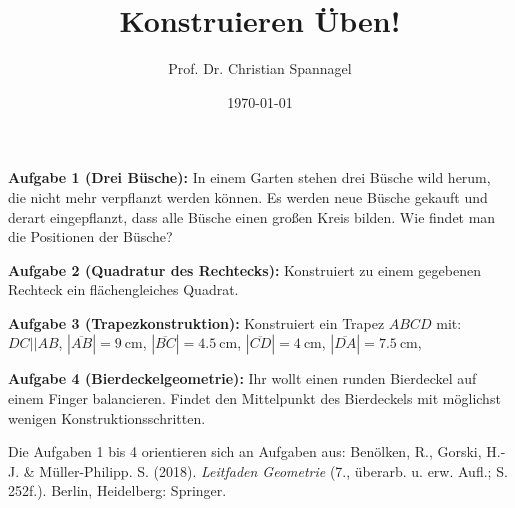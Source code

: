 \documentclass{../cssheet}
\title{Konstruieren Üben!}
\author{Prof. Dr. Christian Spannagel}
\date{\today}
\begin{document}
\printtitle

\textbf{Aufgabe 1 (Drei Büsche):}  In einem Garten stehen drei Büsche wild herum, die nicht mehr verpflanzt werden können. Es werden neue Büsche gekauft und derart eingepflanzt, dass alle Büsche einen großen Kreis bilden. Wie findet man die Positionen der Büsche?

\textbf{Aufgabe 2 (Quadratur des Rechtecks):}  Konstruiert zu einem gegebenen Rechteck ein flächengleiches Quadrat.

\textbf{Aufgabe 3 (Trapezkonstruktion):}  Konstruiert ein Trapez $ABCD$ mit:\\ $DC || AB$, $ |\overline{AB}| =\SI{9}{\cm}$, $|\overline{BC}|=\SI{4,5}{\cm}$, $|\overline{CD}|=\SI{4}{\cm}$, $|\overline{DA}|=\SI{7,5}{\cm}$, 

\textbf{Aufgabe 4 (Bierdeckelgeometrie):}  Ihr wollt einen runden Bierdeckel auf einem Finger balancieren. Findet den Mittelpunkt des Bierdeckels mit möglichst wenigen Konstruktionsschritten. 

\vspace*{5cm}
Die Aufgaben 1 bis 4 orientieren sich an Aufgaben aus: Benölken, R., Gorski, H.-J. \& Müller-Philipp. S. (2018). \emph{Leitfaden Geometrie} (7., überarb. u. erw. Aufl.; S. 252f.). Berlin, Heidelberg: Springer.


\vspace*{10mm}

\printlicense

\printsocials
\end{document}
